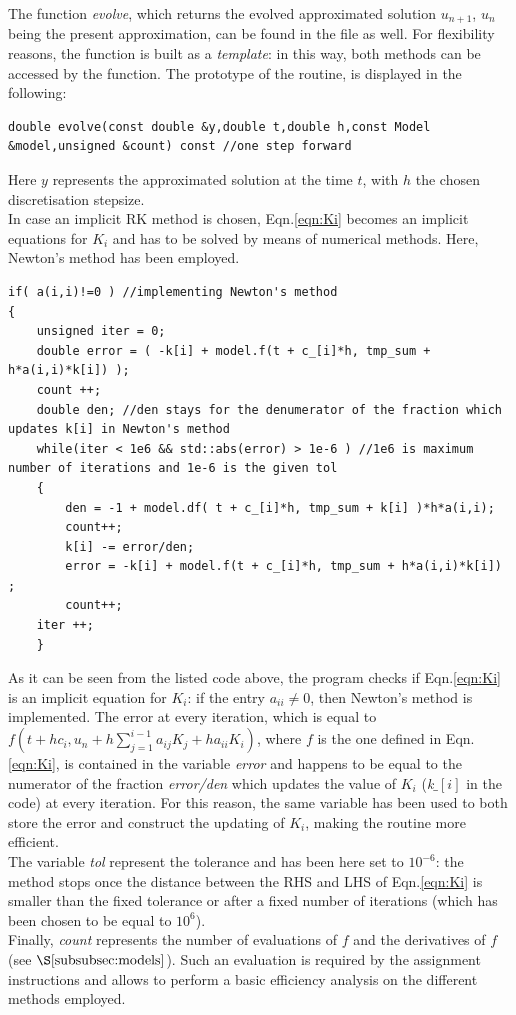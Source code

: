 \documentclass[11pt]{article}
\theoremstyle{theorem}
\theoremstyle{definition}
\begin{document}
The function \emph{evolve}, which returns the evolved approximated solution $u_{n+1}$, $u_n$ being the present approximation, can be found in the file as well. For flexibility reasons, the function is built as a \emph{template}: in this way, both methods can be accessed by the function. The prototype of the routine, is displayed in the following:

\begin{lstlisting}
double evolve(const double &y,double t,double h,const Model &model,unsigned &count) const //one step forward
\end{lstlisting}

Here $y$ represents the approximated solution at the time $t$, with $h$ the chosen discretisation stepsize.\\
In case an implicit RK method is chosen, Eqn.\ref{eqn:Ki} becomes an implicit equations for $K_i$ and has to be solved by means of numerical methods. Here, Newton's method has been employed.\\

\begin{lstlisting}
if( a(i,i)!=0 ) //implementing Newton's method
{
	unsigned iter = 0;
	double error = ( -k[i] + model.f(t + c_[i]*h, tmp_sum + h*a(i,i)*k[i]) );
	count ++;
	double den; //den stays for the denumerator of the fraction which updates k[i] in Newton's method
	while(iter < 1e6 && std::abs(error) > 1e-6 ) //1e6 is maximum number of iterations and 1e-6 is the given tol
	{
		den = -1 + model.df( t + c_[i]*h, tmp_sum + k[i] )*h*a(i,i);
		count++;
		k[i] -= error/den;
		error = -k[i] + model.f(t + c_[i]*h, tmp_sum + h*a(i,i)*k[i]) ;
		count++;
	iter ++;
	}
\end{lstlisting}

As it can be seen from the listed code above, the program checks if Eqn.\eqref{eqn:Ki} is an implicit equation for $K_i$: if the entry $a_{ii}\neq 0$, then Newton's method is implemented. The error at every iteration, which is equal to $f\left(t+hc_i, u_n+h\sum_{j=1}^{i-1}a_{ij}K_j+ha_{ii}K_i\right)$, where $f$ is the one defined in Eqn.\eqref{eqn:Ki}, is contained in the variable \emph{error} and happens to be equal to the numerator of the fraction \emph{error/den} which updates the value of $K_i$ (\emph{k$\_[i]$} in the code) at every iteration. For this reason, the same variable has been used to both store the error and construct the updating of $K_i$, making the routine more efficient.\\
The variable \emph{tol} represent the tolerance and has been here set to $10^{-6}$: the method stops once the distance between the RHS and LHS of Eqn.\eqref{eqn:Ki} is smaller than the fixed tolerance or after a fixed number of iterations (which has been chosen to be equal to $10^6$).\\
Finally, \emph{count} represents the number of evaluations of $f$ and the derivatives of $f$ (see $\S\ref{subsubsec:models}$). Such an evaluation is required by the assignment instructions and allows to perform a basic efficiency analysis on the different methods employed.\\ 
\end{document}
